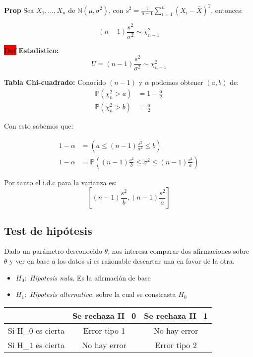 \documentclass[letterpaper,10.5pt,twocolumn]{article} %
\newcommand{\N}{\mathbb{N} }
\newcommand{\Proba}{\mathbb{P} }
\newcommand{\mas}{X_1, ..., X_n}
\newcommand{\hlc}[2][yellow]{ \colorbox{#1}{#2} }
\newcommand{\Prop}{\hlc[amber]{\bfseries Prop}}
\newcommand{\Def}{\hlc[red]{\bfseries Def}}
\let\oldfrac=\frac
\renewcommand{\frac}[2]{\ensuremath{\oldfrac{#1}{#2}}}
\begin{document}
\Prop Sea $\mas$ de $\N (\mu, \sigma^2 ) $, con $s^2 = \frac{1}{n-1} \sum_{i=1}^{n} (X_i - \bar{X})^2 $, entonces:

\begin{equation*}
	(n-1)\frac{s^2}{\sigma^2} \sim \chi_{n-1}^2
\end{equation*}

\Def \textbf{Estadístico:} 
\begin{equation*}
	U =(n-1) \frac{s^2}{ \sigma^2} \sim \chi_{n-1}^2
\end{equation*}

\textbf{Tabla Chi-cuadrado:} Conocido $(n-1)$ y $\alpha$ podemos obtener $(a,b)$ de:
\begin{align*}
	\Proba (\chi_n^2 > a) &= 1- \frac{\alpha}{2} \\
	\Proba (\chi_n^2 > b) &= \frac{\alpha}{2}
\end{align*}

Con esto sabemos que:

\begin{align*}
    1-\alpha &= \left(a \leq (n-1) \frac{s^2}{\sigma^2} \leq b\right) \\
    1-\alpha &= \Proba \left( (n-1)\frac{s^2}{b} \leq \sigma^2 \leq (n-1) \frac{s^2}{a}  \right)
\end{align*}

Por tanto el i.d.c para la varianza es:
\begin{equation*}
    \left[  (n-1)\frac{s^2}{b} , (n-1) \frac{s^2}{a}   \right]
\end{equation*}

\subsection*{Test de hipótesis}

Dado un parámetro desconocido $\theta$, nos interesa comparar dos afirmaciones sobre $\theta$ y ver en base a los datos si es razonable descartar una en favor de la otra.

\begin{itemize}
	\item $H_{0}:$ \textit{Hipotesis nula}. Es la afirmación de base 
	\item $H_{1}:$ \textit{Hipotesis alternativa}. sobre la cual se constrasta $H_{0}$
\end{itemize}

\begin{tabular}{|c|c|c|}
\hline
  & Se rechaza H\_0 & Se rechaza H\_1 \bigstrut\\
\hline
Si H\_0 es cierta & Error tipo 1 & No hay error \bigstrut\\
\hline
Si H\_1 es cierta & No hay error & Error tipo 2 \bigstrut\\
\hline
\end{tabular}\\
\end{document}
